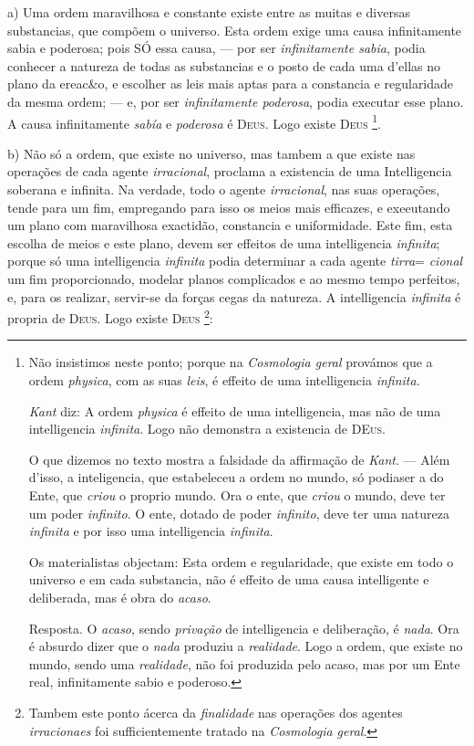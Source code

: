 a) Uma ordem maravilhosa e constante existe entre as muitas e diversas substancias, que compõem o universo. Esta ordem exige uma causa infinitamente sabia e poderosa; pois SÓ essa causa, --- por ser \emph{infinitamente sabia}, podia conhecer a natureza de todas as substancias e o posto de cada uma d'ellas no plano da ereac\&o, e escolher as leis mais aptas para a constancia e regularidade da mesma ordem; --- e, por ser \emph{infinitamente poderosa}, podia executar esse plano. A causa infinitamente \emph{sabía} e \emph{poderosa} é \textsc{Deus}. Logo existe \textsc{Deus} \footnote{Não insistimos neste ponto; porque na \emph{Cosmologia geral} provámos que a ordem \emph{physica}, com as suas \emph{leis}, é effeito de uma intelligencia \emph{infinita}.\par \emph{Kant} diz: A ordem \emph{physica} é effeito de uma intelligencia, mas não de uma intelligencia \emph{infinita}. Logo não demonstra a existencia de \textsc{DEus}.\par O que dizemos no texto mostra a falsidade da affirmação de \emph{Kant}. --- Além d'isso, a inteligencia, que estabeleceu a ordem no mundo, só podiaser a do Ente, que \emph{criou} o proprio mundo. Ora o ente, que \emph{criou} o mundo, deve ter um poder \emph{infinito}. O ente, dotado de poder \emph{infinito}, deve ter uma natureza \emph{infinita} e por isso uma intelligencia \emph{infinita}.\par Os materialistas objectam: Esta ordem e regularidade, que existe em todo o universo e em cada substancia, não é effeito de uma causa intelligente e deliberada, mas é obra do \emph{acaso}.\par Resposta. O \emph{acaso}, sendo \emph{privação} de intelligencia e deliberação, é \emph{nada}. Ora é absurdo dizer que o \emph{nada} produziu a \emph{realidade}. Logo a ordem, que existe no mundo, sendo uma \emph{realidade}, não foi produzida pelo acaso, mas por um Ente real, infinitamente sabio e poderoso.}.

b) Não só a ordem, que existe no universo, mas tambem a que existe nas operações de cada agente \emph{irracional}, proclama   a existencia de uma Intelligencia soberana e infinita. Na verdade, todo o agente \emph{irracional}, nas suas operações, tende para um fim, empregando para isso os meios mais efficazes, e exeeutando um plano com maravilhosa exactidão, constancia e uniformidade. Este fim, esta escolha de meios e este plano, devem ser effeitos de uma intelligencia \emph{infinita}; porque só uma intelligencia \emph{infinita} podia determinar a cada agente \emph{tirra}= \emph{cional} um fim proporcionado, modelar planos complicados e ao mesmo tempo perfeitos, e, para os realizar, servir-se da forças cegas da natureza. A intelligencia \emph{infinita} é propria de \textsc{Deus}. Logo existe \textsc{Deus} \footnote{Tambem este ponto ácerca da \emph{finalidade} nas operações dos agentes \emph{irracionaes} foi sufficientemente tratado na \emph{Cosmologia geral}.}:

